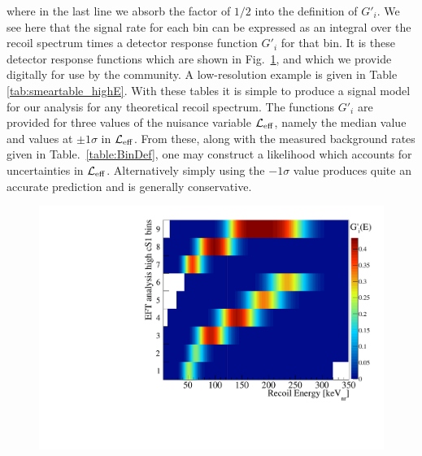%
where in the last line we absorb the factor of $1/2$ into the definition of $G'_i$. We see here that the signal rate for each bin can be expressed as an integral over the recoil spectrum times a detector response function $G'_i$ for that bin. It is these detector response functions which are shown in Fig.~\ref{fig:smeartable_highE}, and which we provide digitally for use by the community. A low-resolution example is given in Table \ref{tab:smeartable_highE}. With these tables it is simple to produce a signal model for our analysis for any theoretical recoil spectrum. The functions $G'_i$ are provided for three values of the nuisance variable $\mathcal{L}_{\mathrm{eff}}$, namely the median value and values at $\pm 1 \sigma$ in $\mathcal{L}_{\mathrm{eff}}$. From these, along with the measured background rates given in Table.~\ref{table:BinDef}, one may construct a likelihood which accounts for uncertainties in $\mathcal{L}_{\mathrm{eff}}$. Alternatively simply using the $-1\sigma$ value produces quite an accurate prediction and is generally conservative.

\begin{figure}[c]
\centerline{\includegraphics[width=0.8\linewidth]{smeartable_highE}}
\label{fig:smeartable_highE}
\end{figure}  

